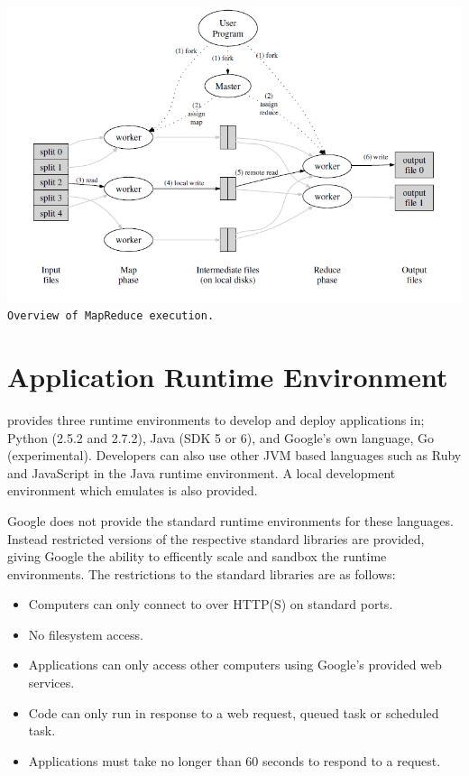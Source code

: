 \begin{center}
\includegraphics[scale=0.4]{figs/MapReduce.png} \\
\texttt{Overview of MapReduce execution.}~\cite{MapReduce}
\end{center}

\section{Application Runtime Environment}
\gae{} provides three runtime environments to develop and deploy applications in; Python (2.5.2 and 2.7.2), Java (SDK 5 or 6), and Google's own language, Go (experimental). Developers can also use other JVM based languages such as Ruby and JavaScript in the Java runtime environment. A local development environment which emulates \gae{} is also provided. 

Google does not provide the standard runtime environments for these languages. Instead restricted versions of the respective standard libraries are provided, giving Google the ability to efficently scale and sandbox the runtime environments. The restrictions to the standard libraries are as follows\ftGAETwo:\ftGAETwoText
\begin{itemize}
\item Computers can only connect to \gae{} over HTTP(S) on standard ports.
\item No filesystem access.
\item Applications can only access other computers using Google's provided web services.
\item Code can only run in response to a web request, queued task or scheduled task. 
\item Applications must take no longer than 60 seconds to respond to a request.
\end{itemize}

